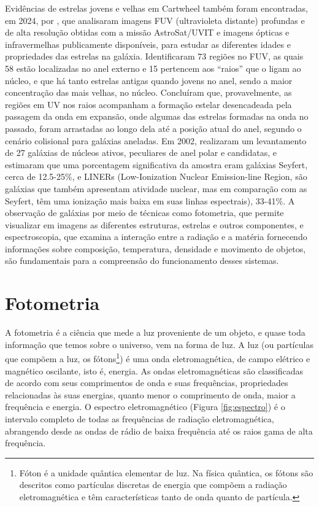 Evidências de estrelas jovens e velhas em Cartwheel também foram encontradas, em 2024, por , que analisaram imagens FUV (ultravioleta distante) profundas e de alta resolução obtidas com a missão AstroSat/UVIT e imagens ópticas e infravermelhas publicamente disponíveis, para estudar as diferentes idades e propriedades das estrelas na galáxia. Identificaram 73 regiões no FUV, as quais 58 estão localizadas no anel externo e 15 pertencem aos ``raios'' que o ligam ao núcleo, e que há tanto estrelas antigas quando jovens no anel, sendo a maior concentração das mais velhas, no núcleo. Concluíram que, provavelmente, as regiões em UV nos raios acompanham a formação estelar desencadeada pela passagem da onda em expansão, onde algumas das estrelas formadas na onda no passado, foram arrastadas ao longo dela até a posição atual do anel, segundo o cenário colisional para galáxias aneladas. Em 2002,  realizaram um levantamento de 27 galáxias de núcleos ativos, peculiares de anel polar e candidatas, e estimaram que uma porcentagem significativa da amostra eram galáxias Seyfert, cerca de 12.5-25\%, e LINERs (Low-Ionization Nuclear Emission-line Region, são galáxias que também apresentam atividade nuclear, mas em comparação com as Seyfert, têm uma ionização mais baixa em suas linhas espectrais), 33-41\%. A observação de galáxias por meio de técnicas como fotometria, que permite visualizar em imagens as diferentes estruturas, estrelas e outros componentes, e espectroscopia, que examina a interação entre a radiação e a matéria fornecendo informações sobre composição, temperatura, densidade e movimento de objetos, são fundamentais para a compreensão do funcionamento desses sistemas.

\section{Fotometria}

A fotometria é a ciência que mede a luz proveniente de um objeto, e quase toda informação que temos sobre o universo, vem na forma de luz. A luz (ou partículas que compõem a luz, os fótons\footnote{Fóton é a unidade quântica elementar de luz. Na física quântica, os fótons são descritos como partículas discretas de energia que compõem a radiação eletromagnética e têm características tanto de onda quanto de partícula.}) é uma onda eletromagnética, de campo elétrico e magnético oscilante, isto é, energia. As ondas eletromagnéticas são classificadas de acordo com seus comprimentos de onda e suas frequências, propriedades relacionadas às suas energias, quanto menor o comprimento de onda, maior a frequência e energia. O espectro eletromagnético (Figura \ref{fig:espectro}) é o intervalo completo de todas as frequências de radiação eletromagnética, abrangendo desde as ondas de rádio de baixa frequência até os raios gama de alta frequência. 

